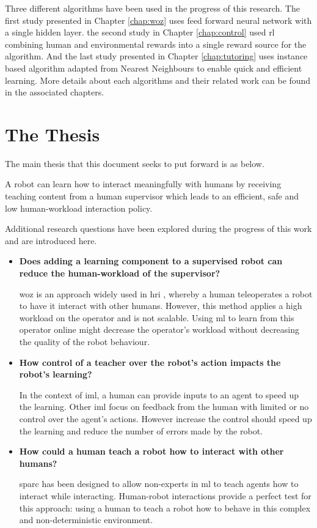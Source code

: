 Three different algorithms have been used in the progress of this research. The first study presented in Chapter \ref{chap:woz} uses feed forward neural network with a single hidden layer. the second study in Chapter \ref{chap:control} used \acrlong{rl} combining human and environmental rewards into a single reward source for the algorithm. And the last study presented in Chapter \ref{chap:tutoring} uses instance based algorithm adapted from Nearest Neighbours to enable quick and efficient learning. More details about each algorithms and their related work can be found in the associated chapters.

\section{The Thesis}\label{sec:intro-thesis}
The main thesis that this document seeks to put forward is as below.

A robot can learn how to interact meaningfully with humans by receiving teaching
content from a human supervisor which leads to an efficient, safe and
low human-workload interaction policy.

Additional research questions have been explored during the progress of this
work and are introduced here.

\begin{itemize}
    \item \textbf{Does adding a learning component to a supervised robot can reduce the human-workload of the supervisor?}
    
        \gls{woz} is an approach widely used in \gls{hri} \citep{riek2012wizard}, whereby a human teleoperates a robot to have it interact with other humans. However, this method applies a high workload on the operator and is not scalable. Using \gls{ml} to learn from this operator online might decrease the operator's workload without decreasing the quality of the robot behaviour.
    
    \item \textbf{How control of a teacher over the robot's action impacts the robot's learning?} 
    
	    In the context of \gls{iml}, a human can provide inputs to an agent to speed up the learning. Other \gls{iml} \citep{thomaz2008teachable,knox2009interactively} focus on feedback from the human with limited or no control over the agent's actions. However increase the control should speed up the learning and reduce the number of errors made by the robot.

    \item \textbf{How could a human teach a robot how to interact with other humans?}

	 \gls{sparc} has been designed to allow non-experts in \gls{ml} to teach agents how to interact while interacting. Human-robot interactions provide a perfect test for this approach: using a human to teach a robot how to behave in this complex and non-deterministic environment.


\end{itemize}

